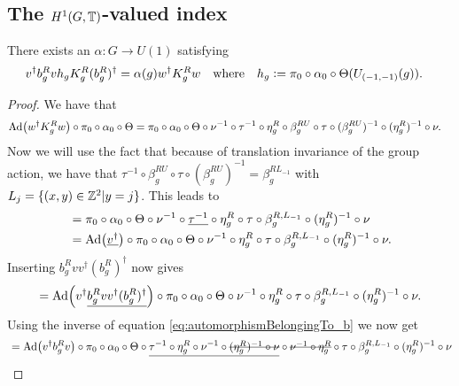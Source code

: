 \documentclass[11pt,a4paper,twoside]{article}
\numberwithin{equation}{section}
\begin{document}
	\subsection{The \texorpdfstring{$H^1(G,\mathbb T)$}{}-valued index}\label{sec:DefinitionH1Index}
	
	\begin{lemma}\label{lem:DefinitionAlpha}
		There exists an $\alpha:G\rightarrow U(1)$ satisfying
		\begin{align}\label{eq:DefinitionOfTheH_1Index}
			v^\dagger b_g^R vh_g K_g^R (b_g^R)^\dagger&=\alpha(g)w^\dagger K_g^R w&&\text{where}&h_g&\vcentcolon=\pi_0\circ\alpha_0\circ\Theta(U_{(-1,-1)}(g)).
		\end{align}
	\end{lemma}
	\begin{proof}
		We have that
		\begin{align}
			&\Ad{w^\dagger K_g^R w}\circ\pi_0\circ\alpha_0\circ\Theta=\pi_0\circ\alpha_0\circ\Theta\circ\nu^{-1}\circ\tau^{-1}\circ\eta_g^R\circ\beta_g^{RU}\circ\tau\circ(\beta_g^{RU})^{-1}\circ(\eta_g^R)^{-1}\circ\nu.
		\end{align}
		Now we will use the fact that because of translation invariance of the group action, we have that $\tau^{-1}\circ\beta_g^{RU}\circ\tau\circ(\beta_g^{RU})^{-1}=\beta_g^{RL_{-1}}$ with $L_j=\{(x,y)\in\mathbb Z^2|y=j\}$. This leads to
		\begin{align}
			&=\pi_0\circ\alpha_0\circ\Theta\circ\nu^{-1}\circ\underline{\tau^{-1}}\circ\eta_g^R\circ\tau\circ\beta_g^{R,L_{-1}}\circ(\eta_g^R)^{-1}\circ\nu\\
			&=\Ad{\underline{v^\dagger}}\circ \pi_0\circ\alpha_0\circ\Theta\circ\nu^{-1}\circ\eta_g^R\circ\tau\circ\beta_g^{R,L_{-1}}\circ(\eta_g^R)^{-1}\circ\nu.
		\end{align}
		Inserting $b^R_g v v^\dagger (b^R_g)^\dagger$ now gives
		\begin{equation}
			=\Ad{v^\dagger\underline{b^R_g v v^\dagger (b^R_g)^\dagger}}\circ \pi_0\circ\alpha_0\circ\Theta\circ\nu^{-1}\circ\eta_g^R\circ\tau\circ\beta_g^{R,L_{-1}}\circ(\eta_g^R)^{-1}\circ\nu.
		\end{equation}
		Using the inverse of equation \eqref{eq:automorphismBelongingTo_b} we now get
		\begin{align}
			&=\Ad{v^\dagger b^R_g v }\circ \pi_0\circ\alpha_0\circ\Theta\circ\underline{\tau^{-1}\circ\eta_g^R\circ\nu^{-1}\circ\stkout{(\eta_g^R)^{-1}\circ\nu}}\circ\stkout{\nu^{-1}\circ\eta_g^R}\circ\tau\circ\beta_g^{R,L_{-1}}\circ(\eta_g^R)^{-1}\circ\nu\\

\end{align}
\end{proof}
\end{document}
